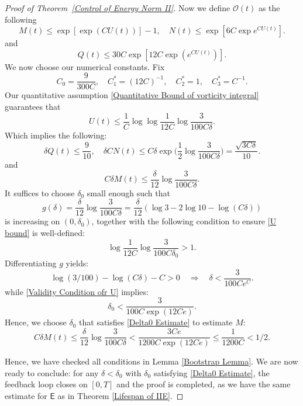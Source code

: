 \documentclass[12pt,letterpaper]{article}
\theoremstyle{plain}
\begin{document}
\begin{proof}[Proof of Theorem~\ref{Control of Energy Norm II}]
    Now we define $\mathscr O(t)$ as the following
    \begin{equation*}
    M(t)\le  \exp[\exp(CU(t))]-1,\quad   N(t)\le \exp[6C\exp e^{ CU(t)}].
    \end{equation*}
   and
    \begin{equation*}
    Q(t)\le  30C\exp[12C\exp (e^{CU(t)})].
    \end{equation*}
    We now choose our numerical constants. Fix
    \begin{equation*}
     C_0=\frac{9}{300C},\quad  C_1^*=(12C)^{-1},\quad C_2^*=1,\quad C_3^*= C^{-1}.   
    \end{equation*}
    Our quantitative assumption \eqref{Quantitative Bound of vorticity integral} guarantees that
    \begin{equation}\label{U bound}
     U(t)\le \frac{1}{C}\log\log\frac{1}{12C}\log\frac{3}{100C\delta} .   
    \end{equation}
    Which implies the following:
    \begin{equation*}
     \delta Q(t)\le \frac{9}{10},\quad \delta CN(t)\le  C\delta\exp\Big(\frac{1}{2}\log\frac{3}{100C\delta}\Big)=\frac{\sqrt {3C\delta}}{10}.
    \end{equation*}
    and 
    \begin{equation*}
     C\delta M(t)\le \frac{\delta}{12} \log\frac{3}{100C\delta} . 
    \end{equation*}
It suffices to choose $\delta_0$ small enough such that 
\begin{equation*}
  g(\delta)=\frac{\delta}{12} \log\frac{3}{100C\delta}=\frac{\delta}{12}(\log 3-2\log 10-\log (C\delta))
\end{equation*}
is increasing on $(0,\delta_0)$, together with the following condition to ensure \eqref{U bound} is well-defined:
\begin{equation}\label{Validity Condition ofr U}
 \log\frac{1}{12C}\log\frac{3}{100 C\delta_0}>1.   
\end{equation}
Differentiating $g$ yields:
\begin{equation*}
   \log(3/100) -\log(C\delta)-C> 0\quad\Longrightarrow \quad \delta< \frac{3}{100 Ce^C}.
\end{equation*}
while \eqref{Validity Condition ofr U} implies:
\begin{equation}\label{Delta0 Estimate}
  \delta_0<  \frac{3}{100C\exp(12Ce)}.
\end{equation}
Hence, we choose $\delta_0$ that satisfies \eqref{Delta0 Estimate} to estimate $M$:
\begin{equation*}
  C\delta M(t)\le \frac{\delta}{12} \log\frac{3}{100C\delta} <\frac{3Ce}{1200C\exp(12Ce)}\le \frac{1}{1200C}<1/2.
\end{equation*}

Hence, we have checked all conditions in Lemma \ref{Bootstrap Lemma}. We are now ready to conclude: for any $\delta<\delta_0$ with $\delta_0$ satisfying \eqref{Delta0 Estimate}, the feedback loop closes on $[0,T]$ and the proof is completed, as we have the same estimate for $\mathsf E$ as in Theorem \ref{Lifespan of IIE}.
\end{proof}
\end{document}
